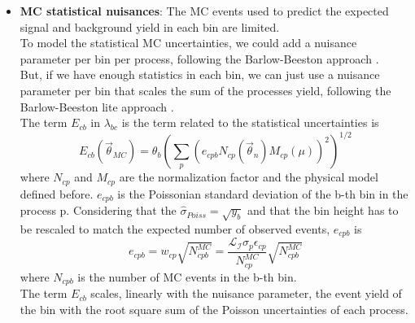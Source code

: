 \begin{itemize}
    
    \item \textbf{MC statistical nuisances}: The MC events used to predict the expected signal and background yield in each bin are limited.\\
    To model the statistical MC uncertainties, we could add a nuisance parameter per bin per process, following the Barlow-Beeston approach \cite{Barlow1993FittingSamples}.\\
    But, if we have enough statistics in each bin, we can just use a nuisance parameter per bin that scales the sum of the processes yield, following the Barlow-Beeston lite approach \cite{Barlow1993FittingSamples}.\\
    The term $E_{cb}$ in $\lambda_{bc}$ is the term related to the statistical uncertainties is
    \begin{equation}
        E_{cb}(\vec{\theta}_{MC})=\theta_b\left(\sum_p \left(e_{cpb}N_{cp}(\vec{\theta}_n)M_{cp}(\mu)\right)^2 \right)^{1/2}
    \end{equation}
    where $N_{cp}$ and $M_{cp}$ are the normalization factor and the physical model defined before.
    $e_{cpb}$ is the Poissonian standard deviation of the b-th bin in the process p. Considering that the $\hat{\sigma}_{Poiss}=\sqrt{y_b}$ and that the bin height has to be rescaled to match the expected number of observed events, $e_{cpb}$ is
    \begin{equation}
        e_{cpb}=w_{cp} \sqrt{N_{cpb}^{MC}}   =\frac{\mathcal{L_I} \sigma_p \epsilon_{cp}}{N^{MC}_{cp}} \sqrt{N^{MC}_{cpb}}
    \end{equation}
    where $N_{cpb}$ is the number of MC events in the b-th bin.\\
    The term $E_{cb}$ scales, linearly with the nuisance parameter, the event yield of the bin with the root square sum of the Poisson uncertainties of each process.\\
\end{itemize}
